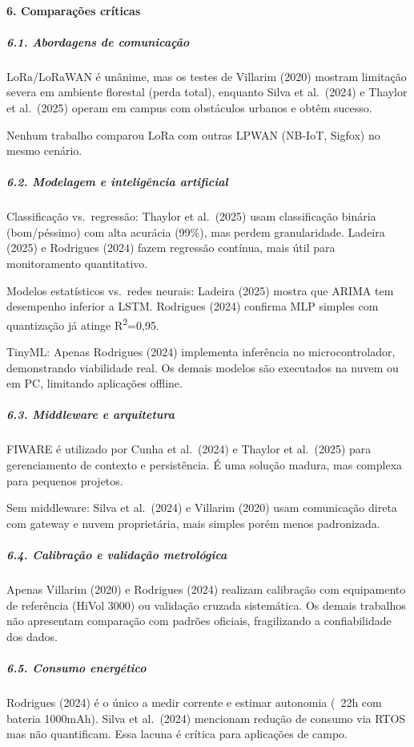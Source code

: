 \paragraph*{6. Comparações críticas}

\subparagraph*{6.1. Abordagens de comunicação}

LoRa/LoRaWAN é unânime, mas os testes de Villarim (2020) mostram limitação severa em ambiente florestal (perda total), enquanto Silva et al.\ (2024) e Thaylor et al.\ (2025) operam em campus com obstáculos urbanos e obtêm sucesso.

Nenhum trabalho comparou LoRa com outras LPWAN (NB-IoT, Sigfox) no mesmo cenário.

\subparagraph*{6.2. Modelagem e inteligência artificial}

Classificação vs.\ regressão: Thaylor et al.\ (2025) usam classificação binária (bom/péssimo) com alta acurácia (99\%), mas perdem granularidade. Ladeira (2025) e Rodrigues (2024) fazem regressão contínua, mais útil para monitoramento quantitativo.

Modelos estatísticos vs.\ redes neurais: Ladeira (2025) mostra que ARIMA tem desempenho inferior a LSTM. Rodrigues (2024) confirma MLP simples com quantização já atinge R\textsuperscript{2}=0,95.

TinyML: Apenas Rodrigues (2024) implementa inferência no microcontrolador, demonstrando viabilidade real. Os demais modelos são executados na nuvem ou em PC, limitando aplicações offline.

\subparagraph*{6.3. Middleware e arquitetura}

FIWARE é utilizado por Cunha et al.\ (2024) e Thaylor et al.\ (2025) para gerenciamento de contexto e persistência. É uma solução madura, mas complexa para pequenos projetos.

Sem middleware: Silva et al.\ (2024) e Villarim (2020) usam comunicação direta com gateway e nuvem proprietária, mais simples porém menos padronizada.

\subparagraph*{6.4. Calibração e validação metrológica}

Apenas Villarim (2020) e Rodrigues (2024) realizam calibração com equipamento de referência (HiVol 3000) ou validação cruzada sistemática. Os demais trabalhos não apresentam comparação com padrões oficiais, fragilizando a confiabilidade dos dados.

\subparagraph*{6.5. Consumo energético}

Rodrigues (2024) é o único a medir corrente e estimar autonomia (~22h com bateria 1000mAh). Silva et al.\ (2024) mencionam redução de consumo via RTOS mas não quantificam. Essa lacuna é crítica para aplicações de campo.

